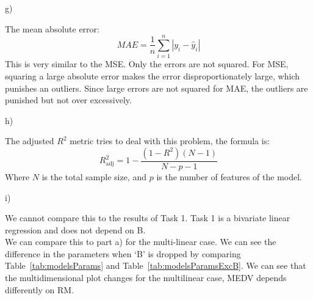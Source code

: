 \documentclass[a4paper,12pt]{article}
\newlength{\QNo}
\begin{document}
\begin{minipage}[t]{0.90\dimexpr\textwidth}
  g)
  \begin{minipage}[t]{\dimexpr\textwidth-\QNo}
    The mean absolute error:\\
    \begin{equation*}
      MAE = \frac{1}{n}\sum_{i=1}^n|y_i -\hat y_i|
    \end{equation*}
    This is very similar to the MSE. Only the errors are not squared.
    For MSE, squaring a large absolute error makes the error disproportionately large, which punishes an outliers.
    Since large errors are not squared for MAE, the outliers are punished but not over excessively.\\
  \end{minipage}

  h)
  \begin{minipage}[t]{\dimexpr\textwidth-\QNo}
    The adjusted $R^2$ metric tries to deal with this problem, the formula is:
    \begin{equation*}
      R^2_{\text{adj}} = 1 - \frac{(1 - R^2)(N - 1)}{N - p - 1}
    \end{equation*}
    Where $N$ is the total sample size, and $p$ is the number of features of the model.\\
  \end{minipage}

  i)
  \begin{minipage}[t]{\dimexpr\textwidth-\QNo}
    We cannot compare this to the results of Task 1.
    Task 1 is a bivariate linear regression and does not depend on B.\\

    We can compare this to part a) for the multi-linear case.
    We can see the difference in the parameters when `B' is dropped by comparing Table~\ref{tab:modelsParams} and Table~\ref{tab:modelsParamsExcB}.
    We can see that the multidimensional plot changes for the multilinear case, MEDV depends differently on RM.
  \end{minipage}
\end{minipage}






\end{document}
